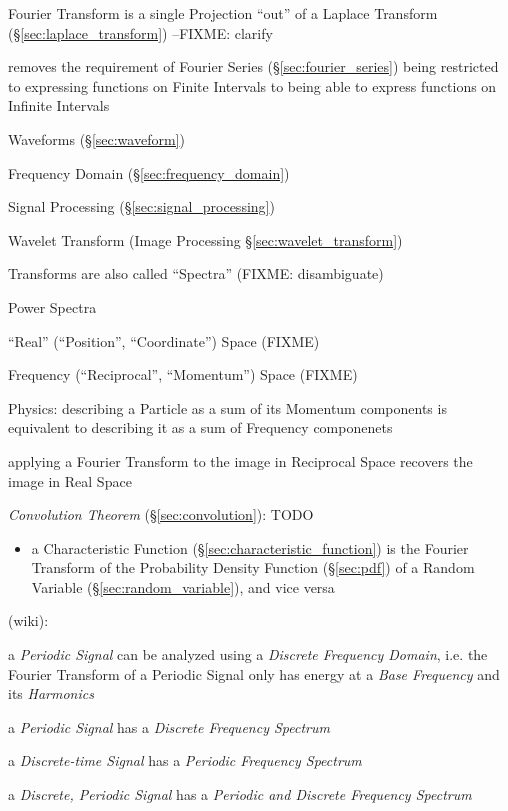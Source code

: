 Fourier Transform is a single Projection ``out'' of a Laplace Transform
(\S\ref{sec:laplace_transform}) --FIXME: clarify

removes the requirement of Fourier Series (\S\ref{sec:fourier_series}) being
restricted to expressing functions on Finite Intervals to being able to express
functions on Infinite Intervals

\fist Waveforms (\S\ref{sec:waveform})

\fist Frequency Domain (\S\ref{sec:frequency_domain})

\fist Signal Processing (\S\ref{sec:signal_processing})

\fist Wavelet Transform (Image Processing \S\ref{sec:wavelet_transform})

Transforms are also called ``Spectra'' (FIXME: disambiguate)

Power Spectra

``Real'' (``Position'', ``Coordinate'') Space (FIXME)

Frequency (``Reciprocal'', ``Momentum'') Space (FIXME)

Physics: describing a Particle as a sum of its Momentum components is equivalent
to describing it as a sum of Frequency componenets

applying a Fourier Transform to the image in Reciprocal Space recovers the image
in Real Space

\emph{Convolution Theorem} (\S\ref{sec:convolution}): TODO

\begin{itemize}
  \item a Characteristic Function (\S\ref{sec:characteristic_function}) is the
    Fourier Transform of the Probability Density Function (\S\ref{sec:pdf}) of a
    Random Variable (\S\ref{sec:random_variable}), and vice versa
\end{itemize}


(wiki):

a \emph{Periodic Signal} can be analyzed using a \emph{Discrete Frequency
  Domain}, i.e. the Fourier Transform of a Periodic Signal only has energy at a
\emph{Base Frequency} and its \emph{Harmonics}

a \emph{Periodic Signal} has a \emph{Discrete Frequency Spectrum}

a \emph{Discrete-time Signal} has a \emph{Periodic Frequency Spectrum}

a \emph{Discrete, Periodic Signal} has a \emph{Periodic and Discrete Frequency
  Spectrum}



